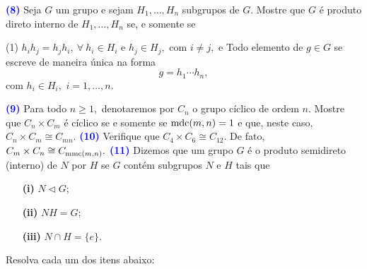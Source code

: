 \documentclass[12pt, a4paper]{article}
\newcommand{\mmc}{{\rm mmc}}
\newcommand{\mdc}{{\rm mdc}}
\newcommand{\negrito}[1]{\mbox{\boldmath{$#1$}}}
\begin{document}
\newline\newline
\textcolor{blue}{\bf(8)}\label{88} Seja $G$ um grupo e sejam $H_1, \ldots, H_n$ subgrupos de $G.$ Mostre que $G$ é produto direto interno de $H_1, \ldots, H_n$ se, e somente se
\begin{tasks}[counter-format={(tsk[a])},label-width=3.6ex, label-format = {\bfseries}, column-sep = {0pt}](1)
\task[\textcolor{Floresta}{$\negrito{(a)} $}] $h_ih_j = h_jh_i, \ \forall \ h_i \in H_i$ e $h_j \in H_j,$ com $i \neq j,$ e
\task[\textcolor{Floresta}{$\negrito{(b)} $}] Todo elemento de $g \in G$ se escreve de maneira única na forma
\[
g = h_1 \cdots h_n,
\]
com $h_i \in H_i,$ $i = 1, \ldots, n.$ 
\end{tasks}
\textcolor{blue}{\bf(9)}\label{89} Para todo $n \ge 1,$ denotaremos por $C_n$ o grupo cíclico de ordem $n.$ Mostre que $C_n \times C_m$ é cíclico se e somente se $\mdc(m,n) = 1$ e que, neste caso, $C_n \times C_m \cong C_{mn}.$
\newline\newline
\textcolor{blue}{\bf(10)}\label{90} Verifique que $C_4 \times C_6 \cong C_{12}.$ De fato, $C_m \times C_n \cong C_{\mmc(m,n)}.$
\newline\newline
\textcolor{blue}{\bf(11)}\label{91} Dizemos que um grupo $G$ é o produto semidireto (interno) de $N$ por $H$ se $G$ contém subgrupos $N$ e $H$ tais que
\begin{itemize}
    \item[\textbf{(i)}] $N \lhd G;$
     \item[\textbf{(ii)}] $NH = G;$
      \item[\textbf{(iii)}] $N \cap H = \{ e \}.$
\end{itemize}
Resolva cada um dos itens abaixo:
\end{document}

